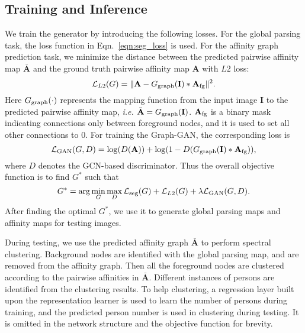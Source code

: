 \documentclass[10pt, letterpaper]{article}
\begin{document}
\subsection{Training and Inference}
We train the generator by introducing the following losses. For the global parsing task, the loss function in Eqn.~\eqref{eqn:seg_loss} is used. For the affinity graph prediction task, we minimize the distance between the predicted pairwise affinity map $\bar{\mathbf{A}}$ and the ground truth pairwise affinity map $\mathbf{A}$ with $L2$ loss:
\begin{equation}
\mathcal{L}_{L2}(G) = \|\mathbf{A} - G_{\rm{graph}}(\mathbf{I})*\mathbf{A}_{\rm{fg}} \|^2.
\end{equation}
Here $G_{\rm{graph}}(\cdot)$ represents the mapping function from the input image $\mathbf{I}$ to the predicted pairwise affinity map, \emph{i.e.} $\bar{\mathbf{A}} = G_{\rm{graph}}(\mathbf{I}) $. $\mathbf{A}_{\rm{fg}}$ is a binary mask indicating connections only between foreground nodes, and it is used to set all other connections to $0$. For training the Graph-GAN, the corresponding loss is
\begin{equation}
\mathcal{L}_{\rm{GAN}}(G,D) = \log (D(\mathbf{A})) + \log (1- D(G_{\mathrm{graph}}(\mathbf{I})*\mathbf{A}_{\rm{fg}})),
\end{equation}
where $D$ denotes the GCN-based  discriminator. Thus the overall objective function is to find $G^*$ such that
\begin{equation}\label{eqn:loss}
G^{*} = \arg \min_G \max_D   \mathcal{L}_{\rm{seg}}(G)+ \mathcal{L}_{L2}(G)+\lambda \mathcal{L}_{\mathrm{GAN}}(G,D).
\end{equation}
After finding the optimal $G^*$, we  use it to generate global parsing maps and affinity maps for testing images. 

During testing, we use the predicted affinity graph $\bar{\mathbf{A}}$ to perform spectral clustering. Background nodes are identified with the global parsing map, and are removed from the affinity graph. Then all the foreground nodes are clustered according to the pairwise affinities in $\bar{\mathbf{A}}$. Different instances of persons are identified from the clustering results. To help clustering, a regression layer built upon the representation learner is used to learn the number of persons during training, and the predicted person number is used in clustering during testing. It is omitted in the network structure and the objective function for brevity. 
\end{document}
